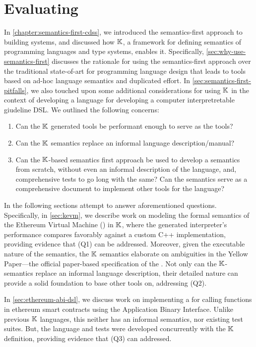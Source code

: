 \chapter{Evaluating \K{}}\label{chapter:evaluating-k}

In \autoref{chapter:semantics-first-cdss}, we introduced the
semantics-first approach to building systems, and discussed how $\mathbb{K}$,
a framework for defining semantics of programming languages and
type systems, enables it. Specifically, \autoref{sec:why-use-semantics-first}
discusses the rationale for using the semantics-first approach over
the traditional state-of-art for programming language design that
leads to tools based on ad-hoc language semantics and duplicated effort.
In \autoref{sec:semantics-first-pitfalls}, we also touched upon
some additional considerations for using $\mathbb{K}$ in the context of
developing a language for developing a computer interpretretable giudeline DSL.
We outlined the following concerns:
\begin{enumerate}[label=(Q\arabic*)]
 \item Can the $\mathbb{K}$ generated tools be performant enough to serve as
 the  tools?
 \item Can the $\mathbb{K}$ semantics replace an informal language description/manual?
 \item Can the $\mathbb{K}$-based semantics first approach be used to develop
 a semantics from scratch, without even an informal description of the language,
  and, comprehensive tests to go long with the same? Can the semantics
  serve as a comprehensive document to implement other tools for the language?
\end{enumerate}
In the following sections attempt to answer aforementioned questions.
Specifically, in \autoref{sec:kevm}, we describe work on modeling the
formal semantics of the Ethereum Virtual Machine (\EVM{}) in $\mathbb{K}$, where
the generated interpreter's performance compares favorably against a
custom C++ implementation, providing evidence that (Q1) can be addressed.
Moreover, given the executable nature of the semantics, the $\mathbb{K}$ semantics
elaborate on ambiguities in the Yellow Paper---the official paper-based
specification of the \EVM{}. Not only can the $\mathbb{K}$-semantics replace an informal
language description, their detailed nature can provide a solid foundation
to base other tools on, addressing (Q2).

In \autoref{sec:ethereum-abi-dsl}, we discuss work on implementing a
\DSL{} for calling functions in ethereum smart contracts using the
Application Binary Interface. Unlike previous $\mathbb{K}$ languages, this
\DSL{} neither has an informal semantics, nor existing test suites.
But, the language and tests were developed concurrently with the $\mathbb{K}$
definition, providing evidence that (Q3) can addressed.

